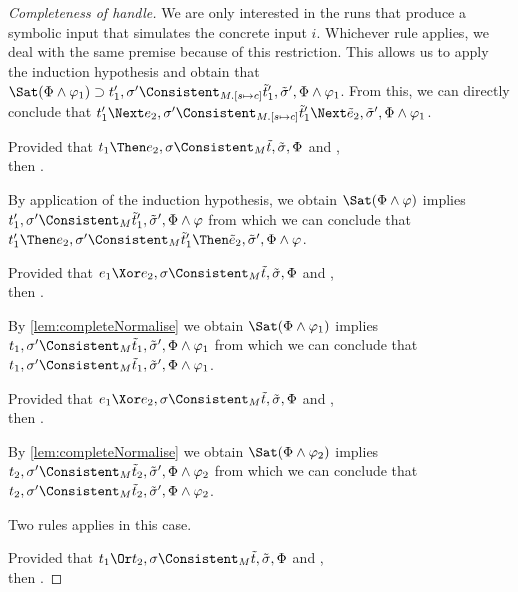 \begin{proof}[Completeness of handle]
{{      We are only interested in the runs that produce a symbolic input that simulates the concrete input $i$.
      Whichever rule applies, we deal with the same premise because of this restriction.
      This allows us to apply the induction hypothesis and obtain that
      $\Sat(\Phi\land\phi_1)\implies t_1',\sigma'\Consistent_{M.[s\mapsto c]}\tilde{t}_1',\tilde{\sigma}',\Phi\land\phi_1$.
      From this, we can directly conclude that $t_1'\Next e_2,\sigma'\Consistent_{M.[s\mapsto c]}\tilde{t}_1'\Next \tilde{e}_2,\tilde{\sigma}',\Phi\land\phi_1$.
      }
    }


    {
    Provided that $t_1\Then e_2,\sigma\Consistent_{M}\tilde{t},\tilde{\sigma},\Phi$ and ,\\
    then .

    By application of the induction hypothesis, we obtain $\Sat(\Phi\land\phi)$ implies $t_1',\sigma'\Consistent_{M}\tilde{t}_1',\tilde{\sigma}',\Phi\land\phi$
    from which we can conclude that $t_1'\Then e_2,\sigma'\Consistent_{M}\tilde{t}_1'\Then \tilde{e}_2,\tilde{\sigma}',\Phi\land\phi$.
    }
    {
      {
      Provided that $e_1\Xor e_2,\sigma\Consistent_{M}\tilde{t},\tilde{\sigma},\Phi$ and ,\\
      then .

      By \cref{lem:completeNormalise} we obtain $\Sat(\Phi\land\phi_1)$ implies $t_1,\sigma'\Consistent_{M}\tilde{t}_1,\tilde{\sigma}',\Phi\land\phi_1$
      from which we can conclude that $t_1,\sigma'\Consistent_{M}\tilde{t}_1,\tilde{\sigma}',\Phi\land\phi_1$.
      }
      {
      Provided that $e_1\Xor e_2,\sigma\Consistent_{M}\tilde{t},\tilde{\sigma},\Phi$ and ,\\
      then .

      By \cref{lem:completeNormalise} we obtain $\Sat(\Phi\land\phi_2)$ implies $t_2,\sigma'\Consistent_{M}\tilde{t}_2,\tilde{\sigma}',\Phi\land\phi_2$
      from which we can conclude that $t_2,\sigma'\Consistent_{M}\tilde{t}_2,\tilde{\sigma}',\Phi\land\phi_2$.
      }
    }
      {
      Two rules applies in this case.\\
      {
      Provided that $t_1\Or t_2,\sigma\Consistent_{M}\tilde{t},\tilde{\sigma},\Phi$ and ,\\
      then .

}}
\end{proof}
